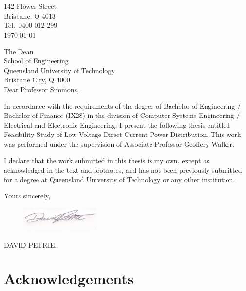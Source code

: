 \newpage


\section*{}

\begin{flushright}
	142 Flower Street\\
	Brisbane, Q 4013\\
	Tel.\ 0400 012 299\\
	\medskip
	\today
\end{flushright}
\begin{flushleft}
  The Dean\\
  School of Engineering\\
  Queensland University of Technology\\
  Brisbane City, Q 4000\\
  \bigskip\bigskip
  Dear Professor Simmons,
\end{flushleft}

In accordance with the requirements of the degree of Bachelor of
Engineering / Bachelor of Finance (IX28) in the division of Computer Systems
Engineering / Electrical and Electronic Engineering, I present the
following thesis entitled Feasibility Study of Low Voltage Direct Current Power Distribution.  This work was performed under the supervision of Associate Professor Geoffery Walker.

I declare that the work submitted in this thesis is my own, except as
acknowledged in the text and footnotes, and has not been previously
submitted for a degree at Queensland University of Technology or any other
institution.

\begin{flushright}
	Yours sincerely,\\
	\medskip
	\begin{figure}[H]
	\hfill\includegraphics[width = 40mm]{images/Signature}%
	\end{figure} 
	\medskip
	DAVID PETRIE.
\end{flushright}

\newpage

\section*{Acknowledgements}



